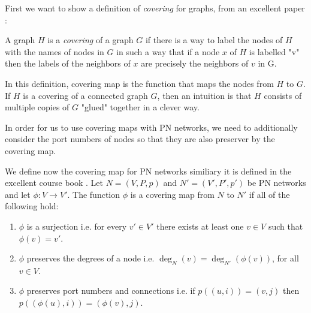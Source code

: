 First we want to show a definition of \emph{covering} for graphs, from an excellent paper
\cite{DBLP:conf/stoc/Angluin80}:
\begin{displayquote}
A graph $H$ is a \emph{covering} of a graph $G$ if there is a way to label the nodes of $H$ with the names of nodes in $G$ in such a way that if a node $x$ of $H$ is labelled "v" then the labels of the neighbors of $x$ are precisely the neighbors of $v$ in G.
\cite{DBLP:conf/stoc/Angluin80}
\end{displayquote}
In this definition, covering map is the function that maps the nodes from $H$ to $G$.
If $H$ is a covering of a connected graph $G$, then an intuition is that $H$ consists of multiple copies of $G$ "glued" together in a clever way.


In order for us to use covering maps with PN networks, we need to additionally consider the port numbers of nodes so that they are also preserver by the covering map.

We define now the covering map for PN networks similiary it is defined in the excellent course book \cite{HirvonenSuomelaDistAlg2020}.
Let $N=(V, P, p)$ and $N'=(V', P', p')$ be PN networks and let $\phi: V \rightarrow V'$.
The function $\phi$ is a covering map from $N$ to $N'$ if all of the following hold:
\begin{enumerate}
  \item $\phi$ is a surjection i.e. for every $v' \in V'$ there exists at least one $v \in V$ such that $\phi(v) = v'$.
  \item $\phi$ preserves the degrees of a node i.e. $\deg_N(v) = \deg_{N'}(\phi(v))$, for all $v \in V$.
  \item $\phi$ preserves port numbers and connections i.e. if $p((u, i)) = (v, j)$ then $p((\phi(u), i)) = (\phi(v), j)$.
\end{enumerate}

